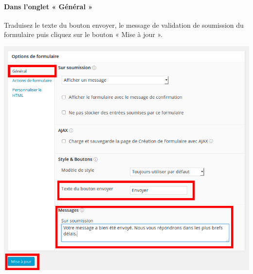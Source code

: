 \documentclass[10pt,a4paper]{article}
\begin{document}
\paragraph{Dans l'onglet « Général »} Traduisez le texte du bouton envoyer, le message de validation de soumission du formulaire puis cliquez sur le bouton « Mise à jour ».
\begin{center}
\includegraphics[scale=0.3]{img/0187.png}
\end{center}
\end{document}

